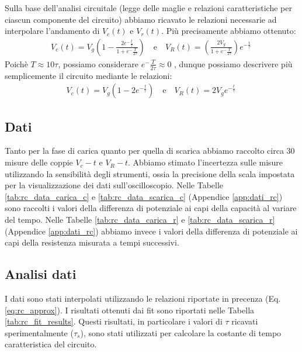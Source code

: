\documentclass[a4paper]{article}
\begin{document}
Sulla base dell'analisi circuitale (legge delle maglie e relazioni caratteristiche per ciascun componente del circuito) abbiamo ricavato le relazioni necessarie ad interpolare l'andamento di $V_c (t)$ e $V_r (t)$.
Più precisamente abbiamo ottenuto:
\begin{align}
	 & V_c(t) = V_g(1-\frac{2e^-\frac{t}{\mathit{\tau}}}{1+e^-\frac{T}{\mathit{2\tau}}})  \quad \text{e} \quad V_R(t) = (\frac{2V_g}{1+e^-\frac{T}{\mathit{2\tau}}})e^{-\frac{t}{\mathit{\tau}}}\quad \label{eq:rc_full} %
\end{align}
Poichè \( \mathit{T\approx10 \mathit{\tau}} \), possiamo considerare \( \mathit{e^-\frac{T}{2\tau}}\approx 0 \) , dunque possiamo descrivere più semplicemente il circuito mediante le relazioni:
\begin{align}
	& V_c(t) = V_g(1-2e^{-\frac{t}{\mathit{\tau}}})  \quad \text{e} \quad V_R(t) = 2V_ge^{-\frac{t}{\mathit{\tau}}}\quad \label{eq:rc_approx} %
\end{align}

\subsection{Dati}
Tanto per la fase di carica quanto per quella di scarica abbiamo raccolto circa 30 misure delle coppie \( \mathit{V_c-t} \) e \( \mathit{V_R-t} \). Abbiamo stimato l'incertezza sulle misure utilizzando la sensibilità degli strumenti, ossia la precisione della scala impostata per la visualizzazione dei dati sull'oscilloscopio.
Nelle Tabelle \ref{tab:rc_data_carica_c} e \ref{tab:rc_data_scarica_c} (Appendice \ref{app:dati_rc}) sono raccolti i valori della differenza di potenziale ai capi della capacità al variare del tempo.
Nelle Tabelle \ref{tab:rc_data_carica_r} e \ref{tab:rc_data_scarica_r} (Appendice \ref{app:dati_rc}) abbiamo invece i valori della differenza di potenziale ai capi della resistenza misurata a tempi successivi.


\subsection{Analisi dati}
I dati sono stati interpolati utilizzando le relazioni riportate in precenza (Eq. \ref{eq:rc_approx}). I risultati ottenuti dai fit sono riportati nelle Tabella \ref{tab:rc_fit_results}. Questi risultati, in particolare i valori di $\tau$ ricavati sperimentalmente ($\tau_s$), sono stati utilizzati per calcolare la costante di tempo caratteristica del circuito.
\end{document}
